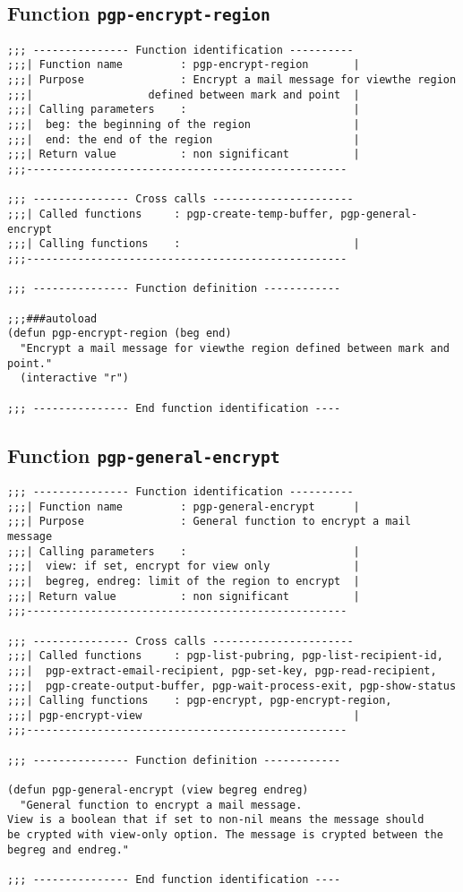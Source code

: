 \subsection{Function {\tt pgp-encrypt-region}}
\leavevmode
\begin{verbatim}
;;; --------------- Function identification ----------
;;;| Function name         : pgp-encrypt-region       |
;;;| Purpose               : Encrypt a mail message for viewthe region
;;;|                  defined between mark and point  |
;;;| Calling parameters    :                          |
;;;|  beg: the beginning of the region                |
;;;|  end: the end of the region                      |
;;;| Return value          : non significant          |
;;;--------------------------------------------------

;;; --------------- Cross calls ----------------------
;;;| Called functions     : pgp-create-temp-buffer, pgp-general-encrypt
;;;| Calling functions    :                           |
;;;--------------------------------------------------

;;; --------------- Function definition ------------

;;;###autoload
(defun pgp-encrypt-region (beg end)
  "Encrypt a mail message for viewthe region defined between mark and point."
  (interactive "r")

;;; --------------- End function identification ----
\end{verbatim}
\subsection{Function {\tt pgp-general-encrypt}}
\leavevmode
\begin{verbatim}
;;; --------------- Function identification ----------
;;;| Function name         : pgp-general-encrypt      |
;;;| Purpose               : General function to encrypt a mail message
;;;| Calling parameters    :                          |
;;;|  view: if set, encrypt for view only             |
;;;|  begreg, endreg: limit of the region to encrypt  |
;;;| Return value          : non significant          |
;;;--------------------------------------------------

;;; --------------- Cross calls ----------------------
;;;| Called functions     : pgp-list-pubring, pgp-list-recipient-id,
;;;|  pgp-extract-email-recipient, pgp-set-key, pgp-read-recipient,
;;;|  pgp-create-output-buffer, pgp-wait-process-exit, pgp-show-status
;;;| Calling functions    : pgp-encrypt, pgp-encrypt-region,
;;;| pgp-encrypt-view                                 |
;;;--------------------------------------------------

;;; --------------- Function definition ------------

(defun pgp-general-encrypt (view begreg endreg)
  "General function to encrypt a mail message.
View is a boolean that if set to non-nil means the message should
be crypted with view-only option. The message is crypted between the 
begreg and endreg."

;;; --------------- End function identification ----
\end{verbatim}
